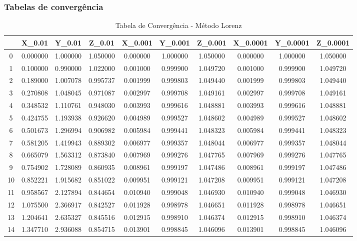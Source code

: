 \documentclass[12pt, a4paper]{article}
\begin{document}
\subsubsection{Tabelas de convergência}
\begin{table}[H]
    \centering
    \footnotesize %
    \begin{tabular}{|c|c|c|c|c|c|c|c|c|c|}
    \toprule
     & X_{0.01} & Y_{0.01} & Z_{0.01} & X_{0.001} & Y_{0.001} & Z_{0.001} & X_{0.0001} & Y_{0.0001} & Z_{0.0001} \\
    \midrule
    0 & 0.000000 & 1.000000 & 1.050000 & 0.000000 & 1.000000 & 1.050000 & 0.000000 & 1.000000 & 1.050000 \\
    1 & 0.100000 & 0.990000 & 1.022000 & 0.001000 & 0.999900 & 1.049720 & 0.001000 & 0.999900 & 1.049720 \\
    2 & 0.189000 & 1.007078 & 0.995737 & 0.001999 & 0.999803 & 1.049440 & 0.001999 & 0.999803 & 1.049440 \\
    3 & 0.270808 & 1.048045 & 0.971087 & 0.002997 & 0.999708 & 1.049161 & 0.002997 & 0.999708 & 1.049161 \\
    4 & 0.348532 & 1.110761 & 0.948030 & 0.003993 & 0.999616 & 1.048881 & 0.003993 & 0.999616 & 1.048881 \\
    5 & 0.424755 & 1.193938 & 0.926620 & 0.004989 & 0.999527 & 1.048602 & 0.004989 & 0.999527 & 1.048602 \\
    6 & 0.501673 & 1.296994 & 0.906982 & 0.005984 & 0.999441 & 1.048323 & 0.005984 & 0.999441 & 1.048323 \\
    7 & 0.581205 & 1.419943 & 0.889302 & 0.006977 & 0.999357 & 1.048044 & 0.006977 & 0.999357 & 1.048044 \\
    8 & 0.665079 & 1.563312 & 0.873840 & 0.007969 & 0.999276 & 1.047765 & 0.007969 & 0.999276 & 1.047765 \\
    9 & 0.754902 & 1.728089 & 0.860935 & 0.008961 & 0.999197 & 1.047486 & 0.008961 & 0.999197 & 1.047486 \\
    10 & 0.852221 & 1.915682 & 0.851022 & 0.009951 & 0.999121 & 1.047208 & 0.009951 & 0.999121 & 1.047208 \\
    11 & 0.958567 & 2.127894 & 0.844654 & 0.010940 & 0.999048 & 1.046930 & 0.010940 & 0.999048 & 1.046930 \\
    12 & 1.075500 & 2.366917 & 0.842527 & 0.011928 & 0.998978 & 1.046651 & 0.011928 & 0.998978 & 1.046651 \\
    13 & 1.204641 & 2.635327 & 0.845516 & 0.012915 & 0.998910 & 1.046374 & 0.012915 & 0.998910 & 1.046374 \\
    14 & 1.347710 & 2.936088 & 0.854715 & 0.013901 & 0.998845 & 1.046096 & 0.013901 & 0.998845 & 1.046096 \\
    \bottomrule
    \end{tabular}
    \caption{Tabela de Convergência - Método Lorenz}
\end{table}
\end{document}
